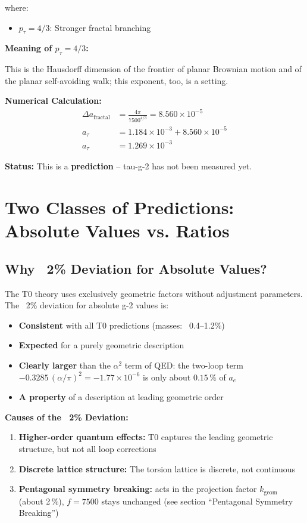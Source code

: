 	where:
	\begin{itemize}
		\item $p_\tau = 4/3$: Stronger fractal branching
	\end{itemize}
	
	\textbf{Meaning of $p_\tau = 4/3$:}
	
	This is the Hausdorff dimension of the frontier of planar Brownian motion and of the planar self-avoiding walk; this exponent, too, is a setting.
	
	\textbf{Numerical Calculation:}
	\begin{align}
		\Delta a_{\text{fractal}} &= \frac{4\pi}{7500^{4/3}} = 8.560 \times 10^{-5} \\
		a_\tau &= 1.184 \times 10^{-3} + 8.560 \times 10^{-5} \\
		a_\tau &= 1.269 \times 10^{-3}
	\end{align}
	
	\textbf{Status:} This is a \textbf{prediction} – tau-g-2 has not been measured yet.
	
	\section{Two Classes of Predictions: Absolute Values vs. Ratios}
	
	\subsection{Why ~2\% Deviation for Absolute Values?}
	
	The T0 theory uses exclusively geometric factors without adjustment parameters. The ~2\% deviation for absolute g-2 values is:
	
	\begin{itemize}
		\item \textbf{Consistent} with all T0 predictions (masses: ~0.4--1.2\%)
		\item \textbf{Expected} for a purely geometric description
		\item \textbf{Clearly larger} than the $\alpha^2$ term of QED: the two-loop term $-0.3285\,(\alpha/\pi)^2 = -1.77 \times 10^{-6}$ is only about $0.15\,\%$ of $a_e$
		\item \textbf{A property} of a description at leading geometric order
	\end{itemize}
	
	\textbf{Causes of the ~2\% Deviation:}
	\begin{enumerate}
		\item \textbf{Higher-order quantum effects:} T0 captures the leading geometric structure, but not all loop corrections
		\item \textbf{Discrete lattice structure:} The torsion lattice is discrete, not continuous
		\item \textbf{Pentagonal symmetry breaking:} acts in the projection factor $k_\text{geom}$ (about 2\,\%), $f = 7500$ stays unchanged (see section \enquote{Pentagonal Symmetry Breaking})
	\end{enumerate}
	
